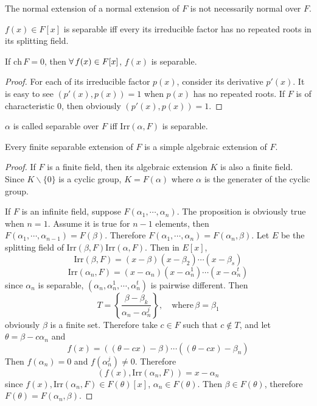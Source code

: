\begin{remark}
    The normal extension of a normal extension of $F$ is not necessarily normal over $F$.
\end{remark}
\begin{definition}
    $f(x)\in F[x]$ is separable iff every its irreducible factor has no repeated roots in its splitting field.
\end{definition}
\begin{proposition}
    If $\mathrm{ch}\,F=0$, then $\forall\, f(x)\in F[x]$, $f(x)$ is separable.
\end{proposition}
\begin{proof}
    For each of its irreducible factor $p(x)$, consider its derivative $p'(x)$. It is easy to see $(p'(x),p(x))=1$ when $p(x)$ has no repeated roots. If $F$ is of characteristic $0$, then obviously $(p'(x),p(x))=1$.
\end{proof}
\begin{definition}
    $\alpha$ is called separable over $F$ iff $\mathrm{Irr}(\alpha,F)$ is separable.
\end{definition}
\begin{proposition}
    Every finite separable extension of $F$ is a simple algebraic extension of $F$.
\end{proposition}
\begin{proof}
    If $F$ is a finite field, then its algebraic extension $K$ is also a finite field. Since $K\backslash\{0\}$ is a cyclic group, $K=F(\alpha)$ where $\alpha$ is the generater of the cyclic group.
    \par If $F$ is an infinite field, suppose $F(\alpha_1,\cdots,\alpha_n)$. The proposition is obviously true when $n=1$. Assume it is true for $n-1$ elements, then $F(\alpha_1,\cdots,\alpha_{n-1})=F(\beta)$. Therefore $F(\alpha_1,\cdots,\alpha_n)=F(\alpha_n,\beta)$. Let $E$ be the splitting field of $\mathrm{Irr}(\beta,F)\mathrm{Irr}(\alpha,F)$. Then in $E[x]$,
    $$
    \mathrm{Irr}(\beta,F)=(x-\beta)(x-\beta_2)\cdots(x-\beta_s)
    $$
    $$
    \mathrm{Irr}(\alpha_n,F)=(x-\alpha_n)(x-\alpha_n^1)\cdots(x-\alpha_n^t)
    $$
    since $\alpha_n$ is separable, $(\alpha_n,\alpha_n^1,\cdots,\alpha_n^t)$ is pairwise different. Then
    $$
    T=\left\{\dfrac{\beta-\beta_k}{\alpha_n-\alpha_n^j}\right\},\quad \mathrm{where}\,\beta=\beta_1
    $$
    obviously $\beta$ is a finite set. Therefore take $c\in F$ such that $c\not\in T$, and let $\theta=\beta-c\alpha_n$ and
    $$
    f(x)=((\theta-cx)-\beta)\cdots((\theta-cx)-\beta_n)
    $$
    Then $f(\alpha_n)=0$ and $f(\alpha_n^j)\neq 0$. Therefore
    $$
    (f(x),\mathrm{Irr}(\alpha_n,F))=x-\alpha_n
    $$
    since $f(x),\mathrm{Irr}(\alpha_n,F)\in F(\theta)[x]$, $\alpha_n\in F(\theta)$. Then $\beta\in F(\theta)$, therefore $F(\theta)=F(\alpha_n,\beta)$.
\end{proof}
